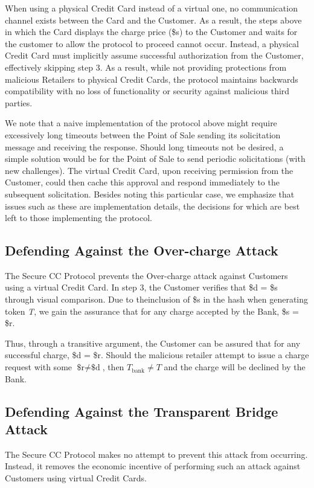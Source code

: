 When using a physical Credit Card instead of a virtual one, no communication channel exists between the Card and the Customer.
As a result, the steps above in which the Card displays the charge price (\$s) to the Customer and waits for the customer to allow the protocol to proceed cannot occur.
Instead, a physical Credit Card must implicitly assume successful authorization from the Customer, effectively skipping step 3.
As a result, while not providing protections from malicious Retailers to physical Credit Cards, the protocol maintains backwards compatibility with no loss of functionality or security against malicious third parties.

We note that a naive implementation of the protocol above might require excessively long timeouts between the Point of Sale sending its solicitation message and receiving the response.
Should long timeouts not be desired, a simple solution would be for the Point of Sale to send periodic solicitations (with new challenges).
The virtual Credit Card, upon receiving permission from the Customer, could then cache this approval and respond immediately to the subsequent solicitation.
Besides noting this particular case, we emphasize that issues such as these are implementation details, the decisions for which are best left to those implementing the protocol.

\subsection{Defending Against the Over-charge Attack}

The Secure CC Protocol prevents the Over-charge attack against Customers using a virtual Credit Card.
In step 3, the Customer verifies that \$d = \$s through visual comparison.
Due to theinclusion of \$s in the hash when generating token \emph{T}, we gain the assurance that for any charge accepted by the Bank, \$s = \$r.

Thus, through a transitive argument, the Customer can be assured that for any successful charge, \$d = \$r.
Should the malicious retailer attempt to issue a charge request with some $\text{\$r} \neq \text{\$d}$, then $T_{\text{bank}} \neq T$ and the charge will be declined by the Bank.

\subsection{Defending Against the Transparent Bridge Attack}

The Secure CC Protocol makes no attempt to prevent this attack from occurring.
Instead, it removes the economic incentive of performing such an attack against Customers using virtual Credit Cards.

